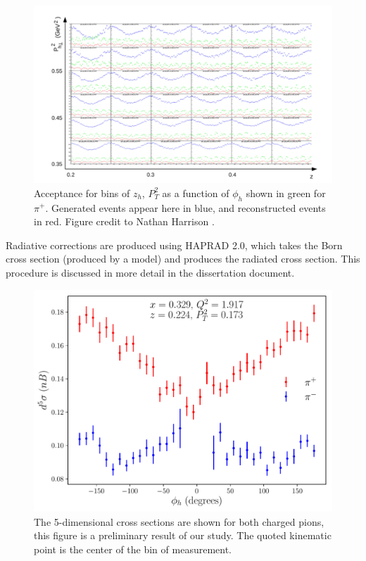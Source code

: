 \begin{figure}
  \centering 

  \includegraphics[width=14cm]{image/nathan-acceptance.png}
  \caption{Acceptance for bins of $z_h$, $P_{T}^{2}$ as a function of $\phi_h$ shown in green for $\pi^+$.  Generated events appear here in blue, and reconstructed events in red.  Figure credit to Nathan Harrison \cite{theses-harrison:2015}.}

\end{figure}

Radiative corrections are produced using HAPRAD 2.0, which takes the Born cross section (produced by a model) and produces the radiated cross section.  This procedure is discussed in more detail in the dissertation document.  


\begin{figure}
  \centering 

  \includegraphics[width=14cm]{image/xs_compare_2043.pdf}
  \caption{The 5-dimensional cross sections are shown for both charged pions, this figure is a preliminary result of our study.  The quoted kinematic point is the center of the bin of measurement.}

\end{figure}
